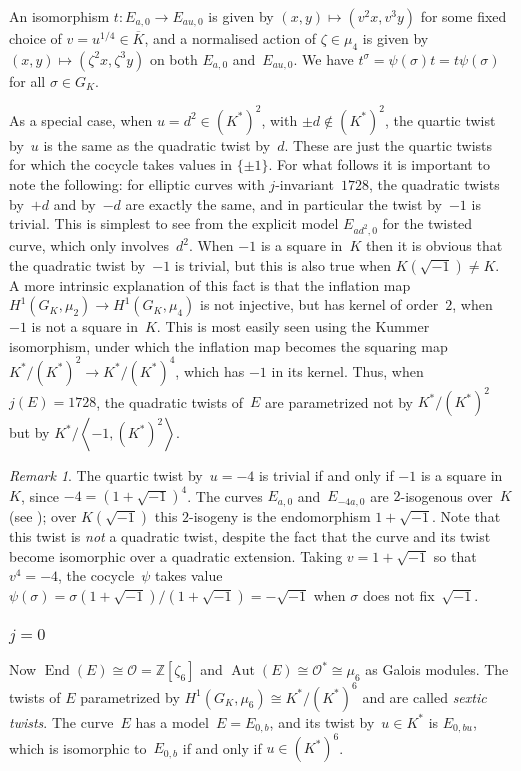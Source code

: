 \documentclass[12pt, reqno]{amsart}
\newcommand{\Z}{\mathbb{Z}}
\newcommand{\Kbar}{{\overline{K}}}
\newcommand{\calO}{\mathcal{O}}
\DeclareMathOperator{\Aut}{Aut}
\DeclareMathOperator{\End}{End}
\numberwithin{equation}{section}
\theoremstyle{definition}
\theoremstyle{remark}
\newtheorem{remark}[theorem]{Remark}
\begin{document}
An isomorphism $t:E_{a,0}\to E_{au,0}$ is given by
$(x,y)\mapsto(v^2x,v^3y)$ for some fixed choice of
$v=u^{1/4}\in\Kbar$, and a normalised action of $\zeta\in\mu_4$ is
given by $(x,y)\mapsto(\zeta^2x,\zeta^3y)$ on both $E_{a,0}$
and~$E_{au,0}$.  We have $t^\sigma = \psi(\sigma)t = t\psi(\sigma)$
for all $\sigma\in G_K$.

As a special case, when $u=d^2\in(K^*)^2$, with $\pm d\notin(K^*)^2$,
the quartic twist by~$u$ is the same as the quadratic twist by~$d$.
These are just the quartic twists for which the cocycle takes values
in $\{\pm1\}$.  For what follows it is important to note the
following: for elliptic curves with $j$-invariant~$1728$, the
quadratic twists by~$+d$ and by~$-d$ are exactly the same, and in
particular the twist by~$-1$ is trivial.  This is simplest to see from
the explicit model $E_{ad^2,0}$ for the twisted curve, which only
involves~$d^2$.  When $-1$ is a square in~$K$ then it is obvious that
the quadratic twist by~$-1$ is trivial, but this is also true when
$K(\sqrt{-1})\not=K$.  A more intrinsic explanation of this fact is
that the inflation map $H^1(G_K,\mu_2)\to H^1(G_K,\mu_4)$ is not
injective, but has kernel of order~$2$, when $-1$ is not a square
in~$K$.  This is most easily seen using the Kummer isomorphism, under
which the inflation map becomes the squaring map $K^*/(K^*)^2 \to
K^*/(K^*)^4$, which has $-1$ in its kernel.  Thus, when $j(E)=1728$,
the quadratic twists of~$E$ are parametrized not by $K^*/(K^*)^2$ but
by $K^*/\left<-1,(K^*)^2\right>$.

\begin{remark}\label{R:2-isog}
The quartic twist by~$u=-4$ is trivial if and only if $-1$ is a square
in~$K$, since $-4=(1+\sqrt{-1})^4$.  The curves $E_{a,0}$
and~$E_{-4a,0}$ are $2$-isogenous over~$K$ (see
\cite[p. 336]{SilvermanI}); over $K(\sqrt{-1})$ this $2$-isogeny is
the endomorphism $1+\sqrt{-1}$.  Note that this twist is \emph{not} a
quadratic twist, despite the fact that the curve and its twist become
isomorphic over a quadratic extension.  Taking $v=1+\sqrt{-1}$ so that
$v^4=-4$, the cocycle~$\psi$ takes value
$\psi(\sigma)=\sigma(1+\sqrt{-1})/(1+\sqrt{-1})=-\sqrt{-1}$ when
$\sigma$ does not fix~$\sqrt{-1}$.
\end{remark}

\subsubsection{$j=0$}
Now $\End(E)\cong\calO=\Z[\zeta_6]$ and
$\Aut(E)\cong\calO^*\cong\mu_6$ as Galois modules.  The twists of $E$
parametrized by $H^1(G_K,\mu_6)\cong K^*/(K^*)^6$ and are called
\emph{sextic twists}.  The curve~$E$ has a model~$E=E_{0,b}$, and its
twist by~$u\in K^*$ is $E_{0,bu}$, which is isomorphic to~$E_{0,b}$ if
and only if $u\in (K^*)^6$.
\end{document}
